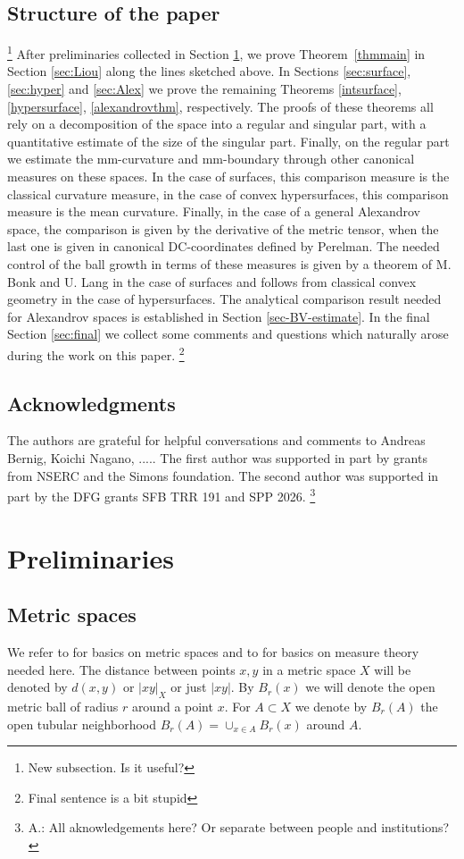 \documentclass[12pt,leqno]{amsart}
\numberwithin{equation}{section}
\theoremstyle{definition}
\theoremstyle{remark}
\newcommand{\tref}[1]{Theorem~\ref{#1}}
\begin{document}
\subsection{Structure of the paper} \footnote{New subsection. Is it useful?}
After preliminaries collected in Section \ref{sec:prelim}, we prove \tref{thmmain} in Section \ref{sec:Liou} along the lines sketched above.
In Sections \ref{sec:surface}, \ref{sec:hyper}  and \ref{sec:Alex} we prove  the remaining Theorems \ref{intsurface}, \ref{hypersurface}, \ref{alexandrovthm}, respectively. The proofs of these theorems all rely on a decomposition of the space into a regular and singular part, with
a quantitative estimate of the size of the singular part. Finally, on the regular part we estimate the mm-curvature and mm-boundary through other
canonical measures  on these spaces. In the case of surfaces, this comparison measure is the classical curvature measure,  in the case of convex hypersurfaces, this comparison measure is the mean curvature.  Finally, in the case of a general  Alexandrov space, the comparison is given by the derivative of the metric tensor, when the last one is given in canonical DC-coordinates defined by Perelman. The needed control of the ball growth
in terms of these measures is given by a theorem of M. Bonk  and U. Lang in the case of surfaces  and follows from classical convex geometry in the case of hypersurfaces. The analytical comparison result  needed for Alexandrov spaces is established in Section \ref{sec-BV-estimate}. In the final
Section \ref{sec:final} we collect some comments and questions which naturally arose during the work on this paper. \footnote{Final sentence is a bit stupid}




\subsection{Acknowledgments}  The authors are grateful for helpful conversations and comments to Andreas Bernig, Koichi Nagano,  .....
The first author was supported in part by grants from NSERC and the Simons foundation. The second author was supported in part by the DFG grants  SFB TRR 191 and SPP 2026. \footnote{A.: All aknowledgements here? Or separate between people and institutions?}


\section{Preliminaries} \label{sec:prelim}
\subsection{Metric spaces}
We refer to \cite{BBI01} for basics on metric spaces and to \cite{Federer} for basics on measure theory needed here.
The distance between points $x,y$ in a metric space $X$ will be denoted by $d(x,y)$ or $|xy|_X$ or just $|xy|$.
By $B_r(x)$ we will denote the open metric ball of radius $r$ around a point $x$. For $A\subset X$
we denote by $B_r (A)$ the open tubular neighborhood $B_r (A) =\cup _{x\in A} B_r (x)$ around $A$.
\end{document}
